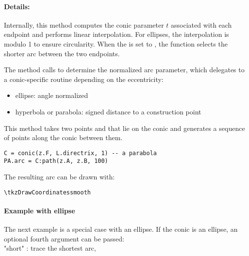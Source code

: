\paragraph{Details:}
Internally, this method computes the conic parameter
$t$ associated with each endpoint and performs linear interpolation. For ellipses, the interpolation is modulo 1 to ensure circularity. When the  is set to , the function selects the shorter arc between the two endpoints.

The method calls  to determine the normalized arc parameter, which delegates to a conic-specific routine depending on the eccentricity:

\begin{itemize}
\item ellipse: angle normalized
\item hyperbola or parabola: signed distance to a construction point
\end{itemize}

\medskip

This method takes two points  and  that lie on the conic and generates a sequence of points along the conic between them.

\begin{mybox}
\begin{verbatim}
C = conic(z.F, L.directrix, 1) -- a parabola
PA.arc = C:path(z.A, z.B, 100)
\end{verbatim}
\end{mybox}

The resulting arc can be drawn with:

\begin{mybox}
\begin{verbatim}
\tkzDrawCoordinatessmooth
\end{verbatim}
\end{mybox}

\paragraph{Example with ellipse}
The next example is a special case with an ellipse. If the conic is an ellipse, an optional fourth argument  can be passed:\\

"short" : trace the shortest arc,

